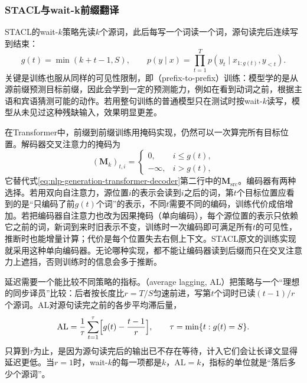 \subsubsection{STACL与wait-k前缀翻译}
\label{sec:nlp-generation-wait-k}

STACL的wait-$k$策略先读$k$个源词，此后每写一个词读一个词，源句读完后连续写到结束\cite{nlp-intro-ma2019stacl}：
\begin{equation}
  g(t)=\min(k+t-1,S),\qquad
  p(y\mid x)=\prod_{t=1}^{T}p(y_t\mid x_{1:g(t)},y_{<t}).
  \label{eq:nlp-generation-wait-k}
\end{equation}
关键是训练也服从同样的可见性限制，即（prefix-to-prefix）训练：模型学的是从源前缀预测目标前缀，因此会学到一定的预测能力，例如在看到动词之前，根据主语和宾语猜测可能的动作。若用整句训练的普通模型只在测试时按wait-$k$读写，模型从未见过这种残缺输入，效果明显更差。

在Transformer中，前缀到前缀训练用掩码实现，仍然可以一次算完所有目标位置。解码器交叉注意力的掩码为
\begin{equation}
  (\bm M_k)_{t,i}=\begin{cases}0,&i\le g(t),\\-\infty,&i>g(t),\end{cases}
  \label{eq:nlp-generation-wait-k-mask}
\end{equation}
它替代式\eqref{eq:nlp-generation-transformer-decoder}第二行中的$\bm M_{\mathrm{src}}$。编码器有两种选择。若用双向自注意力，源位置$i$的表示会读到$i$之后的词，第$t$个目标位置应看到的是“只编码了前$g(t)$个词”的表示，不同$t$需要不同的编码，训练代价成倍增加。若把编码器自注意力也改为因果掩码（单向编码），每个源位置的表示只依赖它之前的词，新词到来时旧表示不变，训练时一次编码即可满足所有$t$的可见性，推断时也能增量计算；代价是每个位置失去右侧上下文。STACL原文的训练实现就采用这种单向编码器。无论哪种实现，都不能让编码器读到后缀而只在交叉注意力上遮挡，否则训练时的信息会多于推断。

延迟需要一个能比较不同策略的指标。（average lagging, AL）把策略与一个“理想的同步译员”比较：后者按长度比$r=T/S$匀速前进，写第$t$个词时已读$(t-1)/r$个源词。AL对源句读完之前的各步平均滞后量，
\begin{equation}
  \mathrm{AL}=\frac{1}{\tau}\sum_{t=1}^{\tau}\Bigl[g(t)-\frac{t-1}{r}\Bigr],\qquad
  \tau=\min\{t:g(t)=S\}.
  \label{eq:nlp-generation-average-lagging}
\end{equation}
只算到$\tau$为止，是因为源句读完后的输出已不存在等待，计入它们会让长译文显得延迟更低。当$r=1$时，wait-$k$的每一项都是$k$，$\mathrm{AL}=k$，指标的单位就是“落后多少个源词”。

